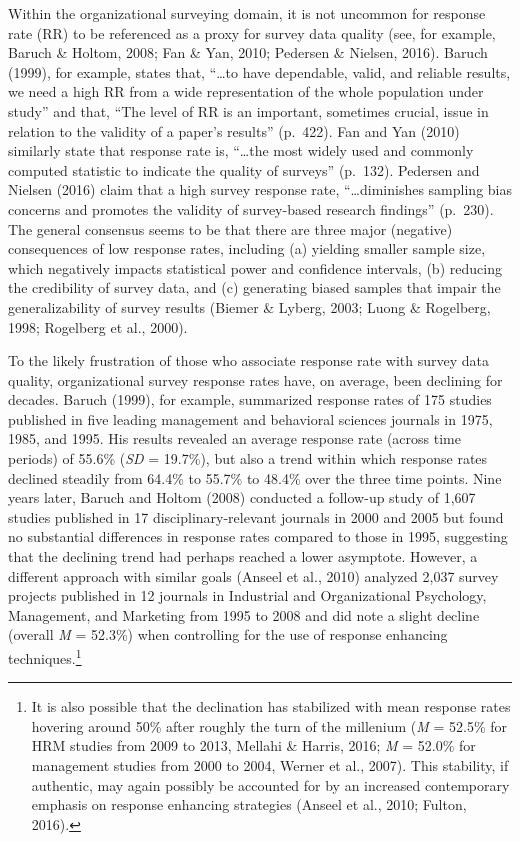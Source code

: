 \documentclass[
  man,mask]{apa7}
\begin{document}
Within the organizational surveying domain, it is not uncommon for response rate (RR) to be referenced as a proxy for survey data quality (see, for example, Baruch \& Holtom, 2008; Fan \& Yan, 2010; Pedersen \& Nielsen, 2016). Baruch (1999), for example, states that, ``\ldots to have dependable, valid, and reliable results, we need a high RR from a wide representation of the whole population under study'' and that, ``The level of RR is an important, sometimes crucial, issue in relation to the validity of a paper's results'' (p.~422). Fan and Yan (2010) similarly state that response rate is, ``\ldots the most widely used and commonly computed statistic to indicate the quality of surveys'' (p.~132). Pedersen and Nielsen (2016) claim that a high survey response rate, ``\ldots diminishes sampling bias concerns and promotes the validity of survey-based research findings'' (p.~230). The general consensus seems to be that there are three major (negative) consequences of low response rates, including (a) yielding smaller sample size, which negatively impacts statistical power and confidence intervals, (b) reducing the credibility of survey data, and (c) generating biased samples that impair the generalizability of survey results (Biemer \& Lyberg, 2003; Luong \& Rogelberg, 1998; Rogelberg et al., 2000).

To the likely frustration of those who associate response rate with survey data quality, organizational survey response rates have, on average, been declining for decades. Baruch (1999), for example, summarized response rates of 175 studies published in five leading management and behavioral sciences journals in 1975, 1985, and 1995. His results revealed an average response rate (across time periods) of 55.6\% (\emph{SD} = 19.7\%), but also a trend within which response rates declined steadily from 64.4\% to 55.7\% to 48.4\% over the three time points. Nine years later, Baruch and Holtom (2008) conducted a follow-up study of 1,607 studies published in 17 disciplinary-relevant journals in 2000 and 2005 but found no substantial differences in response rates compared to those in 1995, suggesting that the declining trend had perhaps reached a lower asymptote. However, a different approach with similar goals (Anseel et al., 2010) analyzed 2,037 survey projects published in 12 journals in Industrial and Organizational Psychology, Management, and Marketing from 1995 to 2008 and did note a slight decline (overall \emph{M} = 52.3\%) when controlling for the use of response enhancing techniques.\footnote{It is also possible that the declination has stabilized with mean response rates hovering around 50\% after roughly the turn of the millenium (\emph{M} = 52.5\% for HRM studies from 2009 to 2013, Mellahi \& Harris, 2016; \emph{M} = 52.0\% for management studies from 2000 to 2004, Werner et al., 2007). This stability, if authentic, may again possibly be accounted for by an increased contemporary emphasis on response enhancing strategies (Anseel et al., 2010; Fulton, 2016).}
\end{document}
